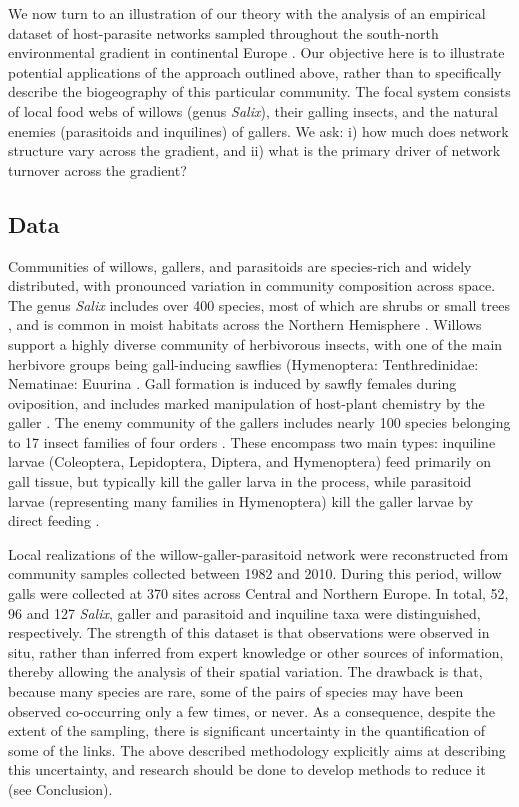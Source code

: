 \documentclass[12pt]{article}
\begin{document}
We now turn to an illustration of our theory with the analysis of an empirical
dataset of host-parasite networks sampled throughout the south-north
environmental gradient in continental Europe \citep{Kopelke2017}. Our
objective here is to illustrate potential applications of the approach
outlined above, rather than to specifically describe the biogeography
of this particular community. The focal system consists of local food webs of
willows (genus \textit{Salix}), their galling insects, and the natural enemies
(parasitoids and inquilines) of gallers. We ask:
i) how much does network structure vary across the gradient, and ii) what is
the primary driver of network turnover across the gradient?

\subsection*{Data}

Communities of willows, gallers, and parasitoids are species-rich and widely
distributed, with pronounced variation in community composition across space.
The genus \textit{Salix} includes over 400 species, most of which are shrubs
or small trees \citep{Argus1997}, and is common in moist habitats across the
Northern Hemisphere \citep{Skvortsov1999}. Willows support a highly diverse
community of herbivorous insects, with one of the main herbivore groups being
gall-inducing sawflies (Hymenoptera: Tenthredinidae: Nematinae: Euurina
\citep{Kopelke1999}. Gall formation is induced by sawfly females during
oviposition, and includes marked manipulation of host-plant chemistry by the
galler \citep{Nyman2000}. The enemy community of the gallers includes nearly
100 species belonging to 17 insect families of four orders
\citep{Kopelke2003}. These encompass two main types: inquiline larvae
(Coleoptera, Lepidoptera, Diptera, and Hymenoptera) feed primarily on gall
tissue, but typically kill the galler larva in the process, while parasitoid
larvae (representing many families in Hymenoptera) kill the galler larvae by
direct feeding \citep{Kopelke2003}. 

Local realizations of the willow-galler-parasitoid network were reconstructed
from community samples collected between 1982 and 2010. During this period,
willow galls were collected at 370 sites across Central and Northern Europe.
In total, 52, 96 and 127 \textit{Salix}, galler and parasitoid and inquiline
taxa were distinguished, respectively. The strength of this dataset is that
observations were observed in situ, rather than inferred from expert knowledge
or other sources of information, thereby allowing the analysis of their
spatial variation. The drawback is that, because many species are rare, some
of the pairs of species may have been observed co-occurring only a few times,
or never. As a consequence, despite the extent of the sampling, there is significant uncertainty in the quantification of some of the links. The above described methodology explicitly aims at describing this uncertainty, and research should be done to develop methods to reduce it (see Conclusion). 
\end{document}
